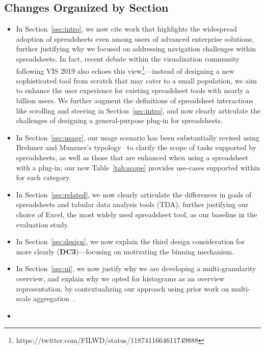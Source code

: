 \subsection*{Changes Organized by Section}
\begin{itemize}
	\leftmargin=25pt \rightmargin=0pt   \itemindent=0pt \listparindent=0pt \topsep=0pt plus 2pt minus 4pt \partopsep=0pt plus 1pt minus 1pt \parsep=0pt plus 1pt \itemsep=\parsep
\item 
In Section~\ref{sec:intro}, we now cite
work that highlights the widespread adoption
of spreadsheets even among users of 
advanced enterprise solutions, further justifying 
why we focused on addressing navigation challenges within
spreadsheets. In fact, recent 
debate within the visualization community following
VIS 2019 also echoes this view\footnote{https://twitter.com/FILWD/status/1187411664611749888}---instead of designing a new sophisticated tool from scratch that 
may cater to a small population, 
we aim to enhance the user experience for
existing spreadsheet tools
with nearly a billion users.
We further augment   
the definitions of spreadsheet 
interactions like scrolling and steering in Section~\ref{sec:intro}, 
and now clearly articulate the challenges of 
designing a general-purpose plug-in for spreadsheets.
\item 
In Section~\ref{sec:usage}, 
our usage scenario has been substantially revised 
using Brehmer and Munzner's typology~\cite{brehmer2013multi} to
clarify the scope of tasks supported by spreadsheets, as well
as those that are enhanced
when using a spreadsheet with a \noah plug-in; our new Table~\ref{tab:scope}
provides use-cases supported within \noah
for each category.
\item
In Section~\ref{sec:related},
we now clearly
articulate the differences in goals
of spreadsheets and tabular data analysis tools (TDA),
further justifying our choice of Excel,
the most widely used spreadsheet tool,
as our baseline in the evaluation study.
\item 
In Section~\ref{sec:design},
we now explain the  
third design consideration 
for \noah more clearly
(\textbf{DC3})---focusing on motivating the binning
mechanism.
\item In Section~\ref{sec:ui}, 
we now justify why we are developing a 
multi-granularity overview,
and explain why 
we opted for histograms as an overview representation, by contextualizing our
approach using prior work on multi-scale aggregation~\cite{elmqvist2009hierarchical}. 
\item 

\end{itemize}
